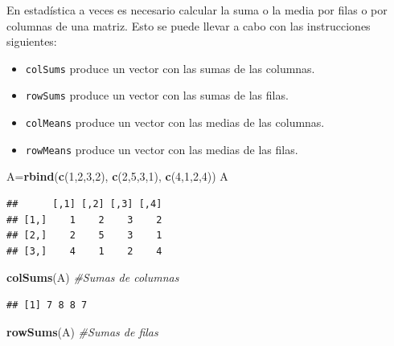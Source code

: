 \documentclass[]{book}
\newenvironment{Shaded}{\begin{snugshade}}{\end{snugshade}}
\newcommand{\CommentTok}[1]{\textcolor[rgb]{0.56,0.35,0.01}{\textit{#1}}}
\newcommand{\DecValTok}[1]{\textcolor[rgb]{0.00,0.00,0.81}{#1}}
\newcommand{\KeywordTok}[1]{\textcolor[rgb]{0.13,0.29,0.53}{\textbf{#1}}}
\newcommand{\NormalTok}[1]{#1}
\providecommand{\tightlist}{%
  \setlength{\itemsep}{0pt}\setlength{\parskip}{0pt}}
\theoremstyle{definition}
\theoremstyle{definition}
\theoremstyle{definition}
\theoremstyle{remark}
\begin{document}
En estadística a veces es necesario calcular la suma o la media por filas o por columnas de una matriz. Esto se puede llevar a cabo con las instrucciones siguientes:

\begin{itemize}
\tightlist
\item
  \texttt{colSums} produce un vector con las sumas de las columnas.
\item
  \texttt{rowSums} produce un vector con las sumas de las filas.
\item
  \texttt{colMeans} produce un vector con las medias de las columnas.
\item
  \texttt{rowMeans} produce un vector con las medias de las filas.
\end{itemize}

\begin{Shaded}
\begin{Highlighting}[]
\NormalTok{A=}\KeywordTok{rbind}\NormalTok{(}\KeywordTok{c}\NormalTok{(}\DecValTok{1}\NormalTok{,}\DecValTok{2}\NormalTok{,}\DecValTok{3}\NormalTok{,}\DecValTok{2}\NormalTok{), }\KeywordTok{c}\NormalTok{(}\DecValTok{2}\NormalTok{,}\DecValTok{5}\NormalTok{,}\DecValTok{3}\NormalTok{,}\DecValTok{1}\NormalTok{), }\KeywordTok{c}\NormalTok{(}\DecValTok{4}\NormalTok{,}\DecValTok{1}\NormalTok{,}\DecValTok{2}\NormalTok{,}\DecValTok{4}\NormalTok{))}
\NormalTok{A}
\end{Highlighting}
\end{Shaded}

\begin{verbatim}
##      [,1] [,2] [,3] [,4]
## [1,]    1    2    3    2
## [2,]    2    5    3    1
## [3,]    4    1    2    4
\end{verbatim}

\begin{Shaded}
\begin{Highlighting}[]
\KeywordTok{colSums}\NormalTok{(A)  }\CommentTok{#Sumas de columnas}
\end{Highlighting}
\end{Shaded}

\begin{verbatim}
## [1] 7 8 8 7
\end{verbatim}

\begin{Shaded}
\begin{Highlighting}[]
\KeywordTok{rowSums}\NormalTok{(A)  }\CommentTok{#Sumas de filas}
\end{Highlighting}
\end{Shaded}
\end{document}
